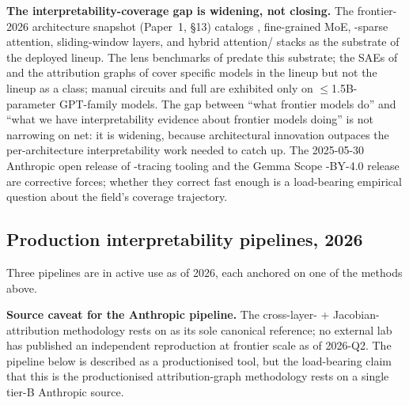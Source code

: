 \begin{contradiction}
\textbf{The interpretability-coverage gap is widening, not closing.}
The frontier-2026 architecture snapshot (Paper~1, §13) catalogs ,
fine-grained MoE, -sparse attention, sliding-window layers, and
hybrid attention/ stacks as the substrate of the deployed lineup.
The lens benchmarks of \citet{belrose2023-tuned-lens} predate this
substrate; the SAEs of \citet{gemma-scope-2024} and the attribution
graphs of \citet{lindsey2025-circuit-tracing} cover specific models in
the lineup but not the lineup as a class; manual circuits and full
 are exhibited only on $\le$1.5B-parameter
GPT-family models. The gap between ``what frontier models do'' and
``what we have interpretability evidence about frontier models doing''
is not narrowing on net: it is widening, because architectural
innovation outpaces the per-architecture interpretability work needed
to catch up. The 2025-05-30 Anthropic open release of -tracing
tooling and the Gemma Scope -BY-4.0 release are corrective forces;
whether they correct fast enough is a load-bearing empirical question
about the field's coverage trajectory.
\end{contradiction}

\subsection{Production interpretability pipelines, 2026}
\label{sec:scaling-pipelines}

Three pipelines are in active use as of 2026, each anchored on one of
the methods above.

\begin{forumsignal}
\textbf{Source caveat for the Anthropic pipeline.} The cross-layer-
+ Jacobian-attribution methodology rests on
\citet{lindsey2025-circuit-tracing} as its sole canonical reference;
no external lab has published an independent reproduction at frontier
scale as of 2026-Q2. The pipeline below is described as a productionised
tool, but the load-bearing claim that this is the productionised
attribution-graph methodology rests on a single tier-B Anthropic source.
\end{forumsignal}

